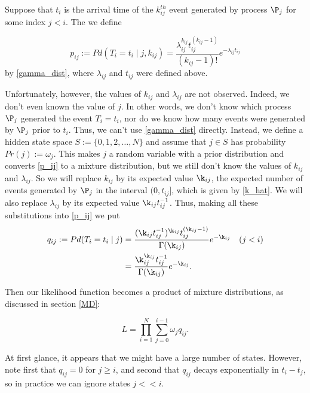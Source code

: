 \documentclass[12pt,leqno]{article}
\begin{document}
Suppose that $t_i$ is the arrival time of the $k_{ij}^{th}$ event generated by process $\P_j$ for some index $j < i$.
The we define

\begin{equation}\label{p_ij}
  p_{ij} :=  Pd(T_i = t_i \mid j, k_{ij}) = \frac{\lambda_{ij}^{k_{ij}}t_{ij}^{(k_{ij}-1)}}{(k_{ij}-1)!}e^{-\lambda_{ij}t_{ij}}
\end{equation}
by \eqref{gamma_dist}, where $\lambda_{ij}$ and $t_{ij}$ were defined above.

Unfortunately, however, the values of $k_{ij}$ and $\lambda_{ij}$ are not observed.  Indeed, we don't even
known the value of $j$. In other words, we don't know
which process $\P_j$ generated the event $T_i = t_i$, nor do we know how many events were generated by $\P_j$
prior to $t_i$.  Thus, we can't use \eqref{gamma_dist} directly. Instead,
we define a hidden state space $S := \{0,1,2,\dots,N\}$ and assume that $j\in{S}$ has probability $Pr(j) := \omega_j$.
This makes $j$ a random variable with a prior distribution and converts \eqref{p_ij} to a mixture distribution, but
we still don't know the values of $k_{ij}$ and $\lambda_{ij}$.  So we
will replace $k_{ij}$ by its expected value $\k_{ij}$, the expected number of events generated by $\P_j$
in the interval $(0,t_{ij}]$, which is  given by \eqref{k_hat}. We will also replace $\lambda_{ij}$ by its expected
  value $\k_{ij}t_{ij}^{-1}$.
Thus, making all these substitutions into \eqref{p_ij} we put
\begin{equation}\label{q_ij}
  \begin{split}
    q_{ij} := Pd(T_i = t_i \mid j) &= \frac{(\k_{ij}t_{ij}^{-1})^{\k_{ij}}t_{ij}^{(\k_{ij}-1)}}{\Gamma(\k_{ij})}e^{-\k_{ij}}\quad (j < i)\\
    &= \frac{\k_{ij}^{\k_{ij}}t_{ij}^{-1}}{\Gamma(\k_{ij})}e^{-\k_{ij}}.
  \end{split}
\end{equation}

Then our likelihood function becomes a product of mixture distributions, as discussed in section \eqref{MD}:

\begin{equation}\label{likelihood}
L = \prod_{i=1}^N\sum_{j=0}^{i-1}\omega_jq_{ij}.
\end{equation}

At first glance, it appears that we might have a large number of states.  However, note first that $q_{ij} = 0$ for $j \ge i$, and second that $q_{ij}$ decays exponentially in $t_i-t_j$, so in practice we can ignore states $j << i$.
\end{document}
